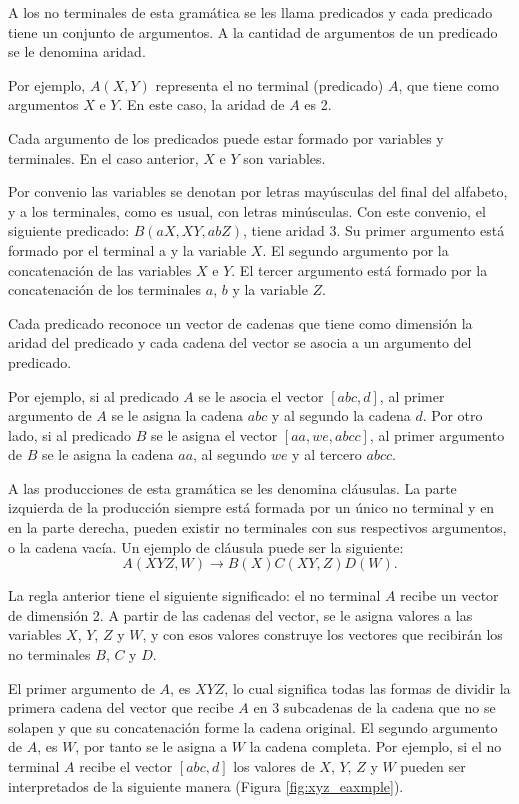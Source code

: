 A los no terminales de esta gramática se les llama predicados y cada predicado tiene un conjunto de argumentos. 
A la cantidad de argumentos de un predicado se le denomina aridad.

Por ejemplo, $A(X,Y)$ representa el no terminal (predicado) $A$, que tiene como argumentos $X$ e $Y$. En este caso, la aridad de $A$ es 2.

Cada argumento de los predicados puede estar formado por variables y terminales. En el caso anterior, $X$ e $Y$ son variables.

Por convenio las variables se denotan por letras mayúsculas del final del alfabeto, y a los terminales, como es 
usual, con letras minúsculas. Con este convenio, el siguiente predicado: $B(aX, XY, abZ)$, tiene aridad 3. Su 
primer argumento está formado por el terminal a y la variable $X$. El segundo argumento por la concatenación 
de las variables $X$ e $Y$. El tercer argumento está formado por la concatenación de los terminales $a$, $b$ y 
la variable $Z$. 

Cada predicado reconoce un vector de cadenas que tiene como dimensión la aridad del predicado y cada cadena 
del vector se asocia a un argumento del predicado.

Por ejemplo, si al predicado $A$ se le asocia el vector $[abc,d]$, al primer argumento de $A$ se le asigna
la cadena $abc$ y al segundo la cadena $d$. Por otro lado, si al predicado $B$ se le asigna el vector $[aa,we,abcc]$,
al primer argumento de $B$ se le asigna la cadena $aa$, al segundo $we$ y al tercero $abcc$.

A las producciones de esta gramática se les denomina cláusulas. La parte izquierda de la producción 
siempre está formada por un único no terminal y en en la parte derecha, pueden existir no terminales 
con sus respectivos argumentos, o la cadena vacía. Un ejemplo de cláusula puede ser la siguiente:
$$A(XYZ,W)\to B(X)C(XY,Z)D(W).$$

La regla anterior tiene el siguiente significado: el no terminal $A$ recibe un vector de dimensión 2. A partir 
de las cadenas del vector, se le asigna valores a las variables $X$, $Y$, $Z$ y $W$, y con esos valores 
construye los vectores que recibirán los no terminales $B$, $C$ y $D$.


El primer argumento de $A$, es $XYZ$, lo cual significa todas las formas de dividir la primera cadena del vector que recibe $A$ en 3 subcadenas de la cadena que no se solapen
y que su concatenación forme la cadena original. El segundo argumento de $A$, es $W$, por tanto se le asigna a $W$ la cadena completa. 
Por ejemplo, si el no terminal $A$ recibe el vector $[abc,d]$ los valores de $X$, $Y$, $Z$ y $W$
pueden ser interpretados de la siguiente manera (Figura \ref{fig:xyz_eaxmple}).


